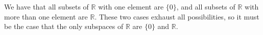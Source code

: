 \documentclass[12pt]{article}
\newenvironment{problem}[2][Problem]
{
	\begin{trivlist} 
		\item[\hskip \labelsep {\bfseries #1 #2:}]
	}
{
	\end{trivlist}
	}
\newenvironment{solution}[1][Solution]
{
	\begin{trivlist} 
		\item[\hskip \labelsep {\itshape #1:}]
	}
	{
	\end{trivlist}
}
\begin{document}
\begin{problem}{5}
\begin{solution}
We have that all subsets of $\mathbb{R}$ with one element are $\{0\}$, and all subsets of $\mathbb{R}$ with more than one element are $\mathbb{R}$. These two cases exhaust all possibilities, so it must be the case that the only subspaces of $\mathbb{R}$ are $\{0\}$ and $\mathbb{R}$.




\end{solution}
\end{problem}
\end{document}
